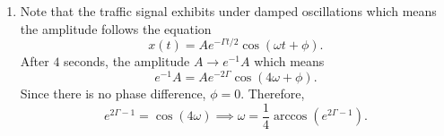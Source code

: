\begin{sol}
\begin{enumerate}[label=\textbf{(\alph*)}]
\item Note that the traffic signal exhibits under damped oscillations which means the amplitude follows the equation 
\[x(t) = Ae^{-\Gamma t/2}\cos (\omega t + \phi).\]
After $4$ seconds, the amplitude $A\rightarrow e^{-1}A$ which means 
\[e^{-1}A = Ae^{-2\Gamma}\cos (4\omega + \phi).\]
Since there is no phase difference, $\phi = 0$. Therefore, 
\[e^{2\Gamma - 1} = \cos (4\omega)\implies \omega = \frac{1}{4}\arccos \left(e^{2\Gamma - 1}\right).\]
\end{enumerate}
\end{sol}